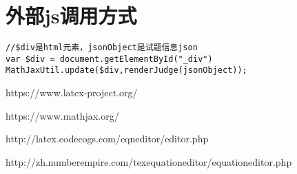 \documentclass[UTF8]{ctexart}
\begin{document}
\section{外部js调用方式}

\begin{lstlisting}
//$div是html元素，jsonObject是试题信息json
var $div = document.getElementById("_div")
MathJaxUtil.update($div,renderJudge(jsonObject));
\end{lstlisting}


\begin{thebibliography}{1}

\bibitem{}
\newblock https://www.latex-project.org/

\bibitem{}
\newblock https://www.mathjax.org/

\bibitem{}
\newblock http://latex.codecogs.com/eqneditor/editor.php

\bibitem{}
\newblock http://zh.numberempire.com/texequationeditor/equationeditor.php

\end{thebibliography}
\end{document}
